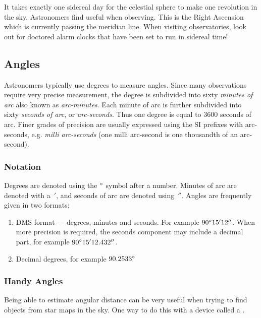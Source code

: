 It takes exactly one sidereal day for the celestial sphere to make one
revolution in the sky. Astronomers find 
useful when observing. This is the Right Ascension which is currently
passing the meridian line.  When visiting observatories, look out for
doctored alarm clocks that have been set to run in sidereal time!



\subsection{Angles}
\label{sec:Concepts:Angles}

Astronomers typically use degrees to measure angles. Since many
observations require very precise measurement, the degree is subdivided
into sixty \emph{minutes of arc} also known as \emph{arc-minutes}. Each
minute of arc is further subdivided into sixty \emph{seconds of arc}, or
\emph{arc-seconds}. Thus one degree is equal to 3600 seconds of arc.
Finer grades of precision are usually expressed using the SI prefixes
with arc-seconds, e.g. \emph{milli arc-seconds} (one milli arc-second is
one thousandth of an arc-second).

\subsubsection{Notation}

Degrees are denoted using the $\degree$ symbol after a number. Minutes of arc are denoted with a~$'$, and seconds of arc are denoted using~$''$. Angles are frequently given in two formats:

\begin{enumerate}
\item
  DMS format --- degrees, minutes and seconds. For example $90\degree15'12''$.
  When more precision is required, the seconds component may include a
  decimal part, for example $90\degree15'12.432''$.
\item
  Decimal degrees, for example $90.2533\degree$
\end{enumerate}

\subsubsection{Handy Angles}
\label{sec:Concepts:Angles:HandyAngles}

Being able to estimate angular distance can be very useful when trying
to find objects from star maps in the sky. One way to do this with a
device called a .

